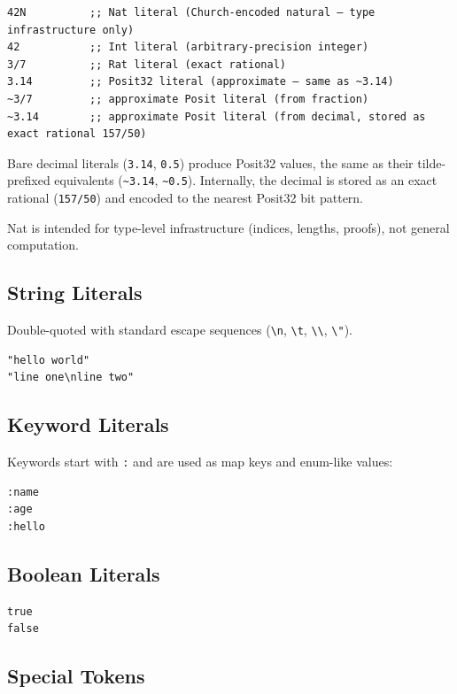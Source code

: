 \documentclass[11pt]{article}
\begin{document}
\begin{verbatim}
42N          ;; Nat literal (Church-encoded natural — type infrastructure only)
42           ;; Int literal (arbitrary-precision integer)
3/7          ;; Rat literal (exact rational)
3.14         ;; Posit32 literal (approximate — same as ~3.14)
~3/7         ;; approximate Posit literal (from fraction)
~3.14        ;; approximate Posit literal (from decimal, stored as exact rational 157/50)
\end{verbatim}

Bare decimal literals (\texttt{3.14}, \texttt{0.5}) produce Posit32 values, the same as their tilde-prefixed
equivalents (\texttt{\textasciitilde{}3.14}, \texttt{\textasciitilde{}0.5}). Internally, the decimal is stored as an exact rational (\texttt{157/50})
and encoded to the nearest Posit32 bit pattern.

Nat is intended for type-level infrastructure (indices, lengths, proofs), not general computation.
\subsection{String Literals}
\label{sec:orgdef83ec}

Double-quoted with standard escape sequences (\texttt{\textbackslash{}n}, \texttt{\textbackslash{}t}, \texttt{\textbackslash{}\textbackslash{}}, \texttt{\textbackslash{}"}).

\begin{verbatim}
"hello world"
"line one\nline two"
\end{verbatim}
\subsection{Keyword Literals}
\label{sec:org38b1556}

Keywords start with \texttt{:} and are used as map keys and enum-like values:

\begin{verbatim}
:name
:age
:hello
\end{verbatim}
\subsection{Boolean Literals}
\label{sec:org723d232}

\begin{verbatim}
true
false
\end{verbatim}
\subsection{Special Tokens}
\label{sec:org9750138}
\end{document}
